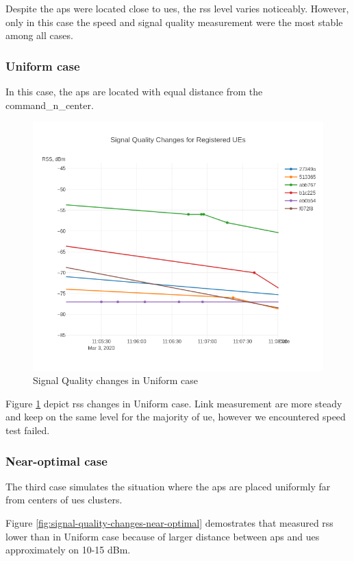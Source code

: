 Despite the \glspl{ap} were located close to \glspl{ue}, the \acrshort{rss} level varies noticeably. However, only in this case the speed and signal quality measurement were the most stable among all cases.

\subsubsection{Uniform case}

In this case, the \glspl{ap} are located with equal distance from the \gls{command_n_center}.

\begin{figure}[H]
	\centering
	\includegraphics[width=0.7\linewidth,keepaspectratio]{images/Exp4_Uniform.png}
\caption{Signal Quality changes in Uniform case}
\label{fig:signal-quality-changes-uniform-optimal}
\end{figure}

Figure \ref{fig:signal-quality-changes-uniform-optimal} depict \acrshort{rss} changes in Uniform case. Link measurement are more steady and keep on the same level for the majority of \gls{ue}, however we encountered speed test failed.

\subsubsection{Near-optimal case}

The third case simulates the situation where the \glspl{ap} are placed
uniformly far from centers of \glspl{ue} clusters.

Figure \ref{fig:signal-quality-changes-near-optimal} demostrates that measured \acrshort{rss} lower than in Uniform case because of larger distance between \glspl{ap} and \glspl{ue} approximately on 10-15 dBm.

